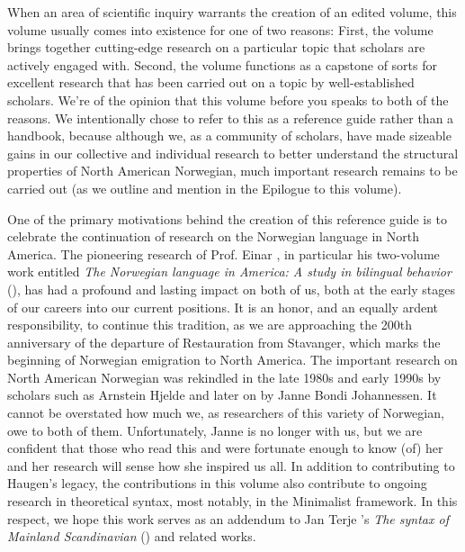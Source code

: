 \begin{refsection}

When an area of scientific inquiry warrants the creation of an edited volume, this volume usually comes into existence for one of two reasons: First, the volume brings together cutting-edge research on a particular topic that scholars are actively engaged with. Second, the volume functions as a capstone of sorts for excellent research that has been carried out on a topic by well-established scholars. We’re of the opinion that this volume before you speaks to both of the reasons. We intentionally chose to refer to this as a reference guide rather than a handbook, because although we, as a community of scholars, have made sizeable gains in our collective and individual research to better understand the structural properties of North American Norwegian, much important research remains to be carried out (as we outline and mention in the Epilogue to this volume). 

One of the primary motivations behind the creation of this reference guide is to celebrate the continuation of research on the Norwegian language in North America. The pioneering research of Prof. Einar \citeauthor{Haugen1953}, in particular his two-volume work entitled \textit{The Norwegian language in America: A study in bilingual behavior} (\citeyear{Haugen1953, Haugen1969}), has had a profound and lasting impact on both of us, both at the early stages of our careers into our current positions. It is an honor, and an equally ardent responsibility, to continue this tradition, as we are approaching the 200th anniversary of the departure of Restauration from Stavanger, which marks the beginning of Norwegian emigration to North America. The important research on North American Norwegian was rekindled in the late 1980s and early 1990s by scholars such as Arnstein Hjelde and later on by Janne Bondi Johannessen. It cannot be overstated how much we, as researchers of this variety of Norwegian, owe to both of them. Unfortunately, Janne is no longer with us, but we are confident that those who read this and were fortunate enough to know (of) her and her research will sense how she inspired us all. In addition to contributing to Haugen’s legacy, the contributions in this volume also contribute to ongoing research in theoretical syntax, most notably, in the Minimalist framework. In this respect, we hope this work serves as an addendum to Jan Terje \citeauthor{Faarlund2019}’s \textit{The syntax of Mainland Scandinavian} (\citeyear{Faarlund2019}) and related works. 


\end{refsection}
